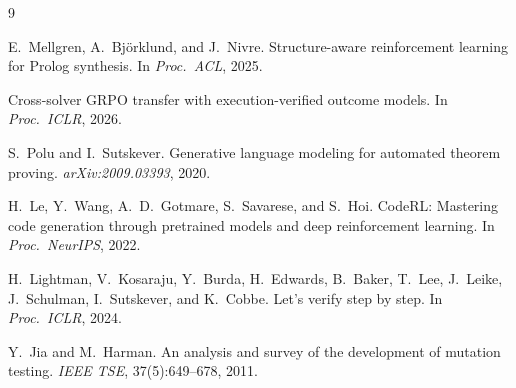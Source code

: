 \documentclass[11pt,a4paper]{article}
\begin{document}
\begin{thebibliography}{9}

E.~Mellgren, A.~Bj{\"o}rklund, and J.~Nivre.
\newblock Structure-aware reinforcement learning for Prolog synthesis.
\newblock In \emph{Proc.\ ACL}, 2025.

Cross-solver GRPO transfer with execution-verified outcome models.
\newblock In \emph{Proc.\ ICLR}, 2026.

S.~Polu and I.~Sutskever.
\newblock Generative language modeling for automated theorem proving.
\newblock \emph{arXiv:2009.03393}, 2020.

H.~Le, Y.~Wang, A.~D.~Gotmare, S.~Savarese, and S.~Hoi.
\newblock CodeRL: Mastering code generation through pretrained models and deep reinforcement learning.
\newblock In \emph{Proc.\ NeurIPS}, 2022.

H.~Lightman, V.~Kosaraju, Y.~Burda, H.~Edwards, B.~Baker, T.~Lee, J.~Leike, J.~Schulman, I.~Sutskever, and K.~Cobbe.
\newblock Let's verify step by step.
\newblock In \emph{Proc.\ ICLR}, 2024.

Y.~Jia and M.~Harman.
\newblock An analysis and survey of the development of mutation testing.
\newblock \emph{IEEE TSE}, 37(5):649--678, 2011.

\end{thebibliography}
\end{document}
